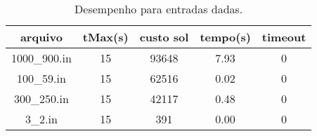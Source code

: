 \begin{table}[H]
\caption{Desempenho para entradas dadas.}
\centering
\begin{tabular}{|c|c|c|c|c|}
\hline
arquivo & tMax(s) & custo sol & tempo(s) & timeout\\
\hline
1000\_900.in & 15 & 93648 & 7.93 & 0\\
\hline
100\_59.in & 15 & 62516 & 0.02 & 0\\
\hline
300\_250.in & 15 & 42117 & 0.48 & 0\\
\hline
3\_2.in & 15 & 391 & 0.00 & 0\\
\hline
\end{tabular}
\end{table}
